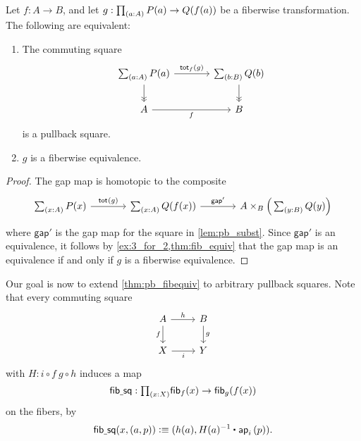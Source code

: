 \begin{thm}\label{thm:pb_fibequiv}
Let $f:A\to B$, and let $g:\prd{a:A}P(a)\to Q(f(a))$ be a fiberwise transformation. The following are equivalent:
\begin{enumerate}
\item The commuting square
\begin{equation*}
\begin{tikzcd}[column sep=large]
\sm{a:A}P(a) \arrow[r,"{\total[f]{g}}"] \arrow[d,->>] & \sm{b:B}Q(b) \arrow[d,->>] \\
A \arrow[r,swap,"f"] & B
\end{tikzcd}
\end{equation*}
is a pullback square.
\item $g$ is a fiberwise equivalence.
\end{enumerate}
\end{thm}

\begin{proof}
The gap map is homotopic to the composite
\begin{equation*}
\begin{tikzcd}[column sep=large]
\sm{x:A}P(x) \arrow[r,"\total{g}"] & \sm{x:A}Q(f(x)) \arrow[r,"{\mathsf{gap}'}"] & A \times_B \Big(\sm{y:B}Q(y)\Big)
\end{tikzcd}
\end{equation*}
where $\mathsf{gap}'$ is the gap map for the square in \cref{lem:pb_subst}. Since $\mathsf{gap}'$ is an equivalence, it follows by \cref{ex:3_for_2,thm:fib_equiv} that the gap map is an equivalence if and only if $g$ is a fiberwise equivalence.
\end{proof}

Our goal is now to extend \cref{thm:pb_fibequiv} to
arbitrary pullback squares. Note that every commuting
square
\begin{equation*}
\begin{tikzcd}
A \arrow[d,swap,"f"] \arrow[r,"h"] & B \arrow[d,"g"] \\
X \arrow[r,swap,"i"] & Y
\end{tikzcd}
\end{equation*}
with $H: i\circ f ~ g \circ h$ induces a map
\begin{equation*}
\mathsf{fib\usc{}sq} : \prd{x:X} \fib{f}{x} \to \fib{g}{f(x)}
\end{equation*}
on the fibers, by
\begin{equation*}
\mathsf{fib\usc{}sq}(x,(a,p))\defeq (h(a),\ct{H(a)^{-1}}{\ap{i}{p}}).
\end{equation*}

